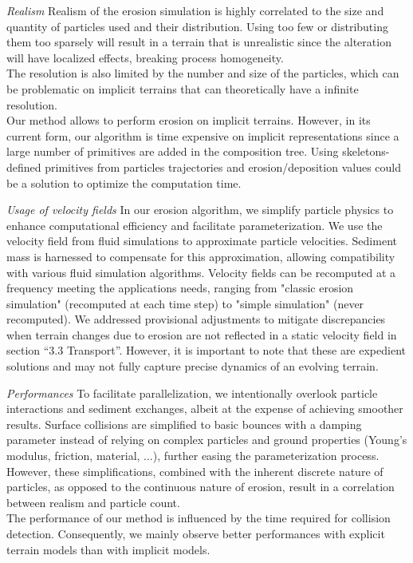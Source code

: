 \textit{Realism}
Realism of the erosion simulation is highly correlated to the size and quantity of particles used and their distribution. Using too few or distributing them too sparsely will result in a terrain that is unrealistic since the alteration will have localized effects, breaking process homogeneity. \\ 
The resolution is also limited by the number and size of the particles, which can be problematic on implicit terrains that can theoretically have a infinite resolution.\\
Our method allows to perform erosion on implicit terrains. However, in its current form, our algorithm is time expensive on implicit representations since a large number of primitives are added in the composition tree. Using skeletons-defined primitives \cite{Hong2013, Rigaudiere2000}%
 from particles trajectories and erosion/deposition values could be a solution to optimize the computation time.

\textit{Usage of velocity fields}
In our erosion algorithm, we simplify particle physics to enhance computational efficiency and facilitate parameterization. We use the velocity field from fluid simulations to approximate particle velocities. Sediment mass is harnessed to compensate for this approximation, allowing compatibility with various fluid simulation algorithms. Velocity fields can be recomputed at a frequency meeting the applications needs, ranging from "classic erosion simulation" (recomputed at each time step) to "simple simulation" (never recomputed). We addressed provisional adjustments to mitigate discrepancies when terrain changes due to erosion are not reflected in a static velocity field in section “3.3 Transport”. However, it is important to note that these are expedient solutions and may not fully capture precise dynamics of an evolving terrain. 

\textit{Performances}
To facilitate parallelization, we intentionally overlook particle interactions and sediment exchanges, albeit at the expense of achieving smoother results. Surface collisions are simplified to basic bounces with a damping parameter instead of relying on complex particles and ground properties (Young’s modulus, friction, material, ...)\cite{Yan2020}, further easing the parameterization process. However, these simplifications, combined with the inherent discrete nature of particles, as opposed to the continuous nature of erosion, result in a correlation between realism and particle count. \\
The performance of our method is influenced by the time required for collision detection. Consequently, we mainly observe better performances with explicit terrain models than with implicit models. 

